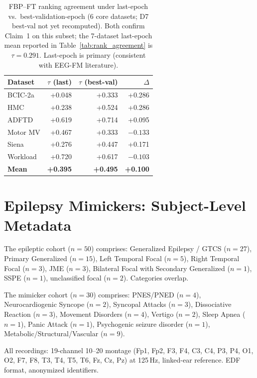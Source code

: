 \documentclass{article}
\begin{document}
\begin{table}[h]
  \caption{FBP--FT ranking agreement under last-epoch vs.\ best-validation-epoch (6 core datasets; D7 best-val not yet recomputed). Both confirm Claim~1 on this subset; the 7-dataset last-epoch mean reported in Table~\ref{tab:rank_agreement} is $\tau = 0.291$. Last-epoch is primary (consistent with EEG-FM literature).}
  \centering\small
  \begin{tabular}{lrrr}
    \toprule
    Dataset & $\tau$ (last) & $\tau$ (best-val) & $\Delta$ \\
    \midrule
    BCIC-2a & +0.048 & +0.333 & +0.286 \\
    HMC & +0.238 & +0.524 & +0.286 \\
    ADFTD & +0.619 & +0.714 & +0.095 \\
    Motor MV & +0.467 & +0.333 & $-0.133$ \\
    Siena & +0.276 & +0.447 & +0.171 \\
    Workload & +0.720 & +0.617 & $-0.103$ \\
    \midrule
    \textbf{Mean} & \textbf{+0.395} & \textbf{+0.495} & \textbf{+0.100} \\
    \bottomrule
  \end{tabular}
\end{table}

\FloatBarrier
\section{Epilepsy Mimickers: Subject-Level Metadata}
\label{app:d7_metadata}

The epileptic cohort ($n=50$) comprises: Generalized Epilepsy / GTCS ($n=27$), Primary Generalized ($n=15$), Left Temporal Focal ($n=5$), Right Temporal Focal ($n=3$), JME ($n=3$), Bilateral Focal with Secondary Generalized ($n=1$), SSPE ($n=1$), unclassified focal ($n=2$). Categories overlap.

The mimicker cohort ($n=30$) comprises: PNES/PNED ($n=4$), Neurocardiogenic Syncope ($n=2$), Syncopal Attacks ($n=3$), Dissociative Reaction ($n=3$), Movement Disorders ($n=4$), Vertigo ($n=2$), Sleep Apnea ($n=1$), Panic Attack ($n=1$), Psychogenic seizure disorder ($n=1$), Metabolic/Structural/Vascular ($n=9$).

All recordings: 19-channel 10--20 montage (Fp1, Fp2, F3, F4, C3, C4, P3, P4, O1, O2, F7, F8, T3, T4, T5, T6, Fz, Cz, Pz) at 125\,Hz, linked-ear reference. EDF format, anonymized identifiers.

\FloatBarrier
\end{document}
